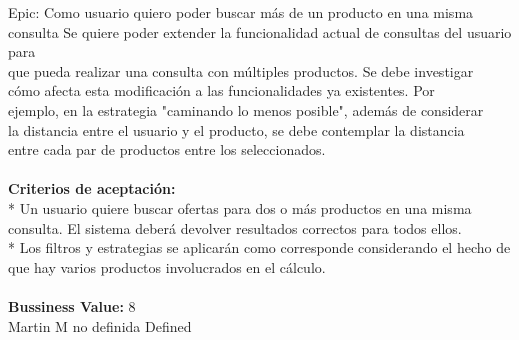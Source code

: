 	{Epic: Como usuario quiero poder buscar más de un producto en una misma consulta} %
	{Se quiere poder extender la funcionalidad actual de consultas del usuario para\\
que pueda realizar una consulta con múltiples productos. Se debe investigar\\
cómo afecta esta modificación a las funcionalidades ya existentes. Por\\
ejemplo, en la estrategia "caminando lo menos posible", además de considerar\\
la distancia entre el usuario y el producto, se debe contemplar la distancia\\
entre cada par de productos entre los seleccionados.\\
  \\
\textbf{Criterios de aceptación:}\\
* Un usuario quiere buscar ofertas para dos o más productos en una misma consulta. El sistema deberá devolver resultados correctos para todos ellos.  \\
* Los filtros y estrategias se aplicarán como corresponde considerando el hecho de que hay varios productos involucrados en el cálculo. \\
  \\
\textbf{Bussiness Value:} 8\\
} %
	{} %
	{} %
	{Martin M} %
	{no definida} %
	{Defined} %


\vspace{20pt}

